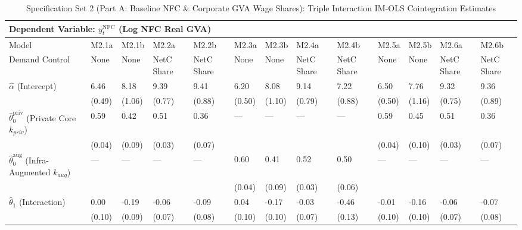 \begin{table}[H]
\centering
\caption{Specification Set 2 (Part A: Baseline NFC \& Corporate GVA Wage Shares): Triple Interaction IM-OLS Cointegration Estimates}
\label{tab:spec_set_2_a}
\scriptsize
\begin{tabular}{p{3.8cm}p{1.5cm}p{1.5cm}p{1.5cm}p{1.5cm}p{1.5cm}p{1.5cm}p{1.5cm}p{1.5cm}p{1.5cm}p{1.5cm}p{1.5cm}p{1.5cm}}
\toprule
\multicolumn{13}{l}{\textbf{Dependent Variable: $y_t^{\text{NFC}}$ (Log NFC Real GVA)}} \\
\midrule
Model & M2.1a & M2.1b & M2.2a & M2.2b & M2.3a & M2.3b & M2.4a & M2.4b & M2.5a & M2.5b & M2.6a & M2.6b  \\
Demand Control & None & None & NetC Share & NetC Share & None & None & NetC Share & NetC Share & None & None & NetC Share & NetC Share  \\
\midrule
$\hat{\alpha}$ (Intercept)  & 6.46 & 8.18 & 9.39 & 9.41 & 6.20 & 8.08 & 9.14 & 7.22 & 6.50 & 7.76 & 9.32 & 9.36  \\
 & {\scriptsize (0.49)} & {\scriptsize (1.06)} & {\scriptsize (0.77)} & {\scriptsize (0.88)} & {\scriptsize (0.50)} & {\scriptsize (1.10)} & {\scriptsize (0.79)} & {\scriptsize (0.88)} & {\scriptsize (0.50)} & {\scriptsize (1.16)} & {\scriptsize (0.75)} & {\scriptsize (0.89)}  \\
$\hat{\theta}_0^{\text{priv}}$ (Private Core $k_{priv}$)  & 0.59 & 0.42 & 0.51 & 0.36 & --- & --- & --- & --- & 0.59 & 0.45 & 0.51 & 0.36  \\
 & {\scriptsize (0.04)} & {\scriptsize (0.09)} & {\scriptsize (0.03)} & {\scriptsize (0.07)} &  &  &  &  & {\scriptsize (0.04)} & {\scriptsize (0.10)} & {\scriptsize (0.03)} & {\scriptsize (0.07)}  \\
$\hat{\theta}_0^{\text{aug}}$ (Infra-Augmented $k_{aug}$)  & --- & --- & --- & --- & 0.60 & 0.41 & 0.52 & 0.50 & --- & --- & --- & ---  \\
 &  &  &  &  & {\scriptsize (0.04)} & {\scriptsize (0.09)} & {\scriptsize (0.03)} & {\scriptsize (0.06)} &  &  &  &   \\
$\hat{\theta}_1$ (Interaction)  & 0.00 & -0.19 & -0.06 & -0.09 & 0.04 & -0.17 & -0.03 & -0.46 & -0.01 & -0.16 & -0.06 & -0.07  \\
 & {\scriptsize (0.10)} & {\scriptsize (0.09)} & {\scriptsize (0.07)} & {\scriptsize (0.08)} & {\scriptsize (0.10)} & {\scriptsize (0.10)} & {\scriptsize (0.07)} & {\scriptsize (0.13)} & {\scriptsize (0.10)} & {\scriptsize (0.10)} & {\scriptsize (0.07)} & {\scriptsize (0.08)}  \\

\end{tabular}
\end{table}
